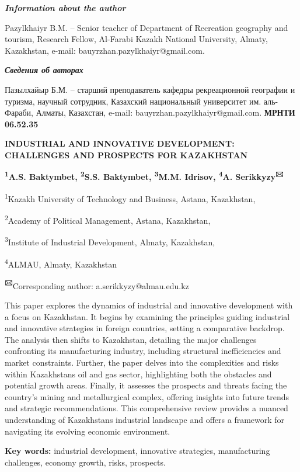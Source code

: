 \emph{{\bfseries Information about the author}}

Pazylkhaiyr B.M. -- Senior teacher of Department of Recreation geography
and tourism, Research Fellow, Al-Farabi Kazakh National University,
Almaty, Kazakhstan, e-mail: bauyrzhan.pazylkhaiyr@gmail.com.

\emph{{\bfseries Сведения об авторах}}

Пазылхайыр Б.М. -- старший преподаватель кафедры рекреационной географии
и туризма, научный сотрудник, Казахский национальный университет им.
аль-Фараби, Алматы, Казахстан, e-mail: bauyrzhan.pazylkhaiyr@gmail.com.\newpage
{\bfseries МРНТИ 06.52.35}

{\bfseries INDUSTRIAL AND INNOVATIVE DEVELOPMENT: CHALLENGES AND PROSPECTS
FOR KAZAKHSTAN}

{\bfseries \textsuperscript{1}A.S. Baktymbet, \textsuperscript{2}S.S.
Baktymbet, \textsuperscript{3}M.M. Idrisov, \textsuperscript{4}A.
Serikkyzy\textsuperscript{🖂}}

\textsuperscript{1}Kazakh University of Technology and Business, Astana,
Kazakhstan,

\textsuperscript{2}Academy of Political Management, Astana, Kazakhstan,

\textsuperscript{3}Institute of Industrial Development, Almaty,
Kazakhstan,

\textsuperscript{4}ALMAU, Almaty, Kazakhstan

{\bfseries \textsuperscript{🖂}}Corresponding author:
a.serikkyzy@almau.edu.kz

This paper explores the dynamics of industrial and innovative
development with a focus on Kazakhstan. It begins by examining the
principles guiding industrial and innovative strategies in foreign
countries, setting a comparative backdrop. The analysis then shifts to
Kazakhstan, detailing the major challenges confronting its manufacturing
industry, including structural inefficiencies and market constraints.
Further, the paper delves into the complexities and risks within
Kazakhstan\textquotesingle s oil and gas sector, highlighting both the
obstacles and potential growth areas. Finally, it assesses the prospects
and threats facing the country's mining and metallurgical complex,
offering insights into future trends and strategic recommendations. This
comprehensive review provides a nuanced understanding of
Kazakhstan\textquotesingle s industrial landscape and offers a framework
for navigating its evolving economic environment.

{\bfseries Key words:} industrial development, innovative strategies,
manufacturing challenges, economy growth, risks, prospects.

